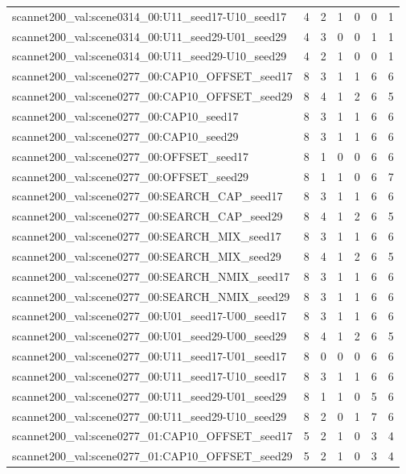 \begin{table}[t]
\begin{tabular}{lrrrrrr}
scannet200\_val:scene0314\_00:U11\_seed17-U10\_seed17 & 4 & 2 & 1 & 0 & 0 & 1 \\
scannet200\_val:scene0314\_00:U11\_seed29-U01\_seed29 & 4 & 3 & 0 & 0 & 1 & 1 \\
scannet200\_val:scene0314\_00:U11\_seed29-U10\_seed29 & 4 & 2 & 1 & 0 & 0 & 1 \\
scannet200\_val:scene0277\_00:CAP10\_OFFSET\_seed17 & 8 & 3 & 1 & 1 & 6 & 6 \\
scannet200\_val:scene0277\_00:CAP10\_OFFSET\_seed29 & 8 & 4 & 1 & 2 & 6 & 5 \\
scannet200\_val:scene0277\_00:CAP10\_seed17 & 8 & 3 & 1 & 1 & 6 & 6 \\
scannet200\_val:scene0277\_00:CAP10\_seed29 & 8 & 3 & 1 & 1 & 6 & 6 \\
scannet200\_val:scene0277\_00:OFFSET\_seed17 & 8 & 1 & 0 & 0 & 6 & 6 \\
scannet200\_val:scene0277\_00:OFFSET\_seed29 & 8 & 1 & 1 & 0 & 6 & 7 \\
scannet200\_val:scene0277\_00:SEARCH\_CAP\_seed17 & 8 & 3 & 1 & 1 & 6 & 6 \\
scannet200\_val:scene0277\_00:SEARCH\_CAP\_seed29 & 8 & 4 & 1 & 2 & 6 & 5 \\
scannet200\_val:scene0277\_00:SEARCH\_MIX\_seed17 & 8 & 3 & 1 & 1 & 6 & 6 \\
scannet200\_val:scene0277\_00:SEARCH\_MIX\_seed29 & 8 & 4 & 1 & 2 & 6 & 5 \\
scannet200\_val:scene0277\_00:SEARCH\_NMIX\_seed17 & 8 & 3 & 1 & 1 & 6 & 6 \\
scannet200\_val:scene0277\_00:SEARCH\_NMIX\_seed29 & 8 & 3 & 1 & 1 & 6 & 6 \\
scannet200\_val:scene0277\_00:U01\_seed17-U00\_seed17 & 8 & 3 & 1 & 1 & 6 & 6 \\
scannet200\_val:scene0277\_00:U01\_seed29-U00\_seed29 & 8 & 4 & 1 & 2 & 6 & 5 \\
scannet200\_val:scene0277\_00:U11\_seed17-U01\_seed17 & 8 & 0 & 0 & 0 & 6 & 6 \\
scannet200\_val:scene0277\_00:U11\_seed17-U10\_seed17 & 8 & 3 & 1 & 1 & 6 & 6 \\
scannet200\_val:scene0277\_00:U11\_seed29-U01\_seed29 & 8 & 1 & 1 & 0 & 5 & 6 \\
scannet200\_val:scene0277\_00:U11\_seed29-U10\_seed29 & 8 & 2 & 0 & 1 & 7 & 6 \\
scannet200\_val:scene0277\_01:CAP10\_OFFSET\_seed17 & 5 & 2 & 1 & 0 & 3 & 4 \\
scannet200\_val:scene0277\_01:CAP10\_OFFSET\_seed29 & 5 & 2 & 1 & 0 & 3 & 4 \\

\end{tabular}
\end{table}
